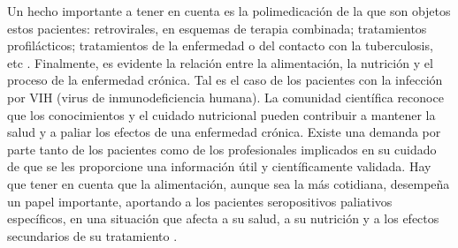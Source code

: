 \documentclass[a4paper,twocolumn,10pt]{article}
\begin{document}
Un hecho importante a tener en cuenta es la polimedicación de la que son objetos estos pacientes: retrovirales, en esquemas de terapia combinada; tratamientos profilácticos; tratamientos de la enfermedad o del contacto con la tuberculosis, etc \cite{Ferri2002}. \newline \newline
Finalmente, es evidente la relación entre la alimentación, la nutrición y el proceso de la enfermedad crónica. Tal es el caso de los pacientes con la infección por VIH (virus de inmunodeficiencia humana). La comunidad científica reconoce que los conocimientos y el cuidado nutricional pueden contribuir a mantener la salud y a paliar los efectos de una enfermedad crónica. Existe una demanda por parte tanto de los pacientes como de los profesionales implicados en su cuidado de que se les proporcione una información útil y científicamente validada. Hay que tener en cuenta que la alimentación, aunque sea la más cotidiana, desempeña un papel importante, aportando a los pacientes seropositivos paliativos específicos, en una situación que afecta a su salud, a su nutrición y a los efectos secundarios de su tratamiento \cite{Herrera2004}.
\end{document}
